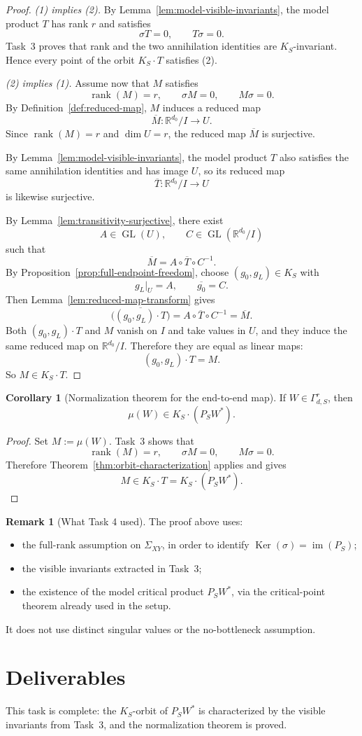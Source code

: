 \documentclass{article}
\newcommand{\rk}{\operatorname{rank}}
\newcommand{\GL}{\operatorname{GL}}
\newcommand{\R}{\mathbb{R}}
\newcommand{\im}{\operatorname{im}}
\newcommand{\Ker}{\operatorname{Ker}}
\theoremstyle{definition}
\newtheorem{corollary}[theorem]{Corollary}
\newtheorem{remark}[theorem]{Remark}
\begin{document}
\begin{proof}
\textit{(1) implies (2).}
By Lemma~\ref{lem:model-visible-invariants}, the model product $T$ has rank $r$ and satisfies
\[
\sigma T=0,
\qquad
T\sigma=0.
\]
Task~3 proves that rank and the two annihilation identities are $K_S$-invariant. Hence every point of the orbit $K_S\cdot T$ satisfies (2).

\smallskip
\textit{(2) implies (1).}
Assume now that $M$ satisfies
\[
\rk(M)=r,
\qquad
\sigma M=0,
\qquad
M\sigma=0.
\]
By Definition~\ref{def:reduced-map}, $M$ induces a reduced map
\[
\overline M:\R^{d_0}/I\to U.
\]
Since $\rk(M)=r$ and $\dim U=r$, the reduced map $\overline M$ is surjective.

By Lemma~\ref{lem:model-visible-invariants}, the model product $T$ also satisfies the same annihilation identities and has image $U$, so its reduced map
\[
\overline T:\R^{d_0}/I\to U
\]
is likewise surjective.

By Lemma~\ref{lem:transitivity-surjective}, there exist
\[
A\in \GL(U),
\qquad
C\in \GL(\R^{d_0}/I)
\]
such that
\[
\overline M=A\circ \overline T\circ C^{-1}.
\]
By Proposition~\ref{prop:full-endpoint-freedom}, choose $(g_0,g_L)\in K_S$ with
\[
g_L|_U=A,
\qquad
\overline{g_0}=C.
\]
Then Lemma~\ref{lem:reduced-map-transform} gives
\[
\overline{\bigl((g_0,g_L)\cdot T\bigr)}
=
A\circ \overline T\circ C^{-1}
=
\overline M.
\]
Both $(g_0,g_L)\cdot T$ and $M$ vanish on $I$ and take values in $U$, and they induce the same reduced map on $\R^{d_0}/I$. Therefore they are equal as linear maps:
\[
(g_0,g_L)\cdot T=M.
\]
So $M\in K_S\cdot T$.
\end{proof}

\begin{corollary}[Normalization theorem for the end-to-end map]\label{cor:normalization-theorem}
If $W\in \Gamma_{d,S}^r$, then
\[
\mu(W)\in K_S\cdot (P_SW^\ast).
\]
\end{corollary}

\begin{proof}
Set $M:=\mu(W)$. Task~3 shows that
\[
\rk(M)=r,
\qquad
\sigma M=0,
\qquad
M\sigma=0.
\]
Therefore Theorem~\ref{thm:orbit-characterization} applies and gives
\[
M\in K_S\cdot T=K_S\cdot (P_SW^\ast).
\]
\end{proof}

\begin{remark}[What Task 4 used]
The proof above uses:
\begin{itemize}
\item the full-rank assumption on $\Sigma_{XY}$, in order to identify $\Ker(\sigma)=\im(P_S)$;
\item the visible invariants extracted in Task~3;
\item the existence of the model critical product $P_SW^\ast$, via the critical-point theorem already used in the setup.
\end{itemize}
It does not use distinct singular values or the no-bottleneck assumption.
\end{remark}

\section{Deliverables}

This task is complete: the $K_S$-orbit of $P_SW^\ast$ is characterized by the visible invariants from Task~3, and the normalization theorem is proved.
\end{document}
